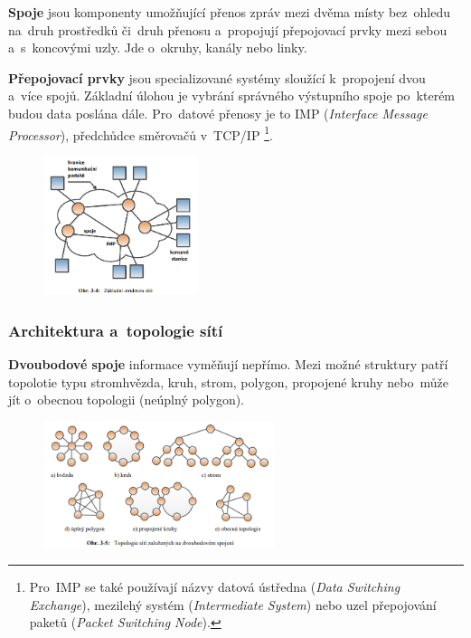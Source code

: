 \textbf{Spoje} jsou komponenty umožňující přenos zpráv mezi dvěma místy bez~ohledu na~druh prostředků či~druh přenosu a~propojují přepojovací prvky mezi sebou a~s~koncovými uzly. Jde o~okruhy, kanály nebo linky.

\textbf{Přepojovací prvky} jsou specializované systémy sloužící k~propojení dvou a~více spojů. Základní úlohou je vybrání správného výstupního spoje po~kterém budou data poslána dále. Pro~datové přenosy je to IMP (\emph{Interface Message Processor}), předchůdce směrovačů v~TCP/IP%
\footnote{Pro~IMP se také používají názvy datová ústředna (\emph{Data Switching Exchange}), mezilehý systém (\emph{Intermediate System}) nebo uzel přepojování paketů (\emph{Packet Switching Node}).}.

\begin{figure}[ht]
	\centering
	\includegraphics[width=0.4\textwidth]{images/q01_imp}
\end{figure}

\subsubsection{Architektura a~topologie sítí}

\textbf{Dvoubodové spoje} informace vyměňují nepřímo. Mezi možné struktury patří topolotie typu stromhvězda, kruh, strom, polygon, propojené kruhy nebo~může jít o~obecnou topologii (neúplný polygon).

\begin{figure}[ht]
	\centering
	\includegraphics[width=0.6\textwidth]{images/q01_network_topology}
\end{figure}

